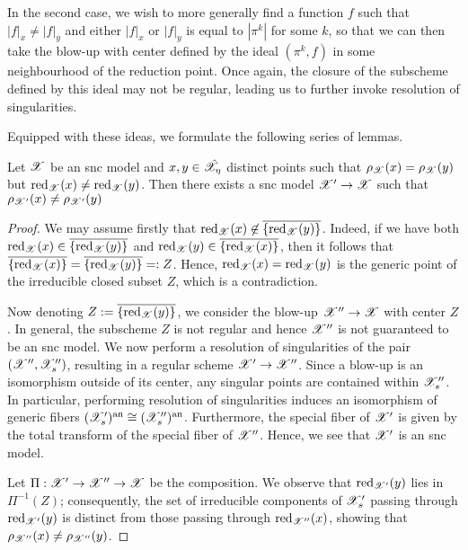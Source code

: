 In the second case, we wish to more generally find a function $f$ such that $|f|_x \neq |f|_y$ and either $|f|_x$ or $|f|_y$ is equal to $|\pi^{k}|$ for some $k$, so that we can then take the blow-up with center defined by the ideal $(\pi^{k}, f)$ in some neighbourhood of the reduction point.
Once again, the closure of the subscheme defined by this ideal may not be regular, leading us to further invoke resolution of singularities.

Equipped with these ideas, we formulate the following series of lemmas.


\begin{lemma}\label{rednotequal}
    Let $\mathscr{X}$ be an snc model and $x, y \in \hat{\mathscr{X}}_{\eta}$ distinct points such that $\rho_{\mathscr{X}}(x) = \rho_{\mathscr{X}}(y)$ but $\operatorname{red}_{\mathscr{X}}(x) \neq \operatorname{red}_{\mathscr{X}}(y)$.
    Then there exists a snc model $\mathscr{X}' \to \mathscr{X}$ such that $\rho_{\mathscr{X}'}(x) \neq \rho_{\mathscr{X}'}(y)$
\end{lemma}
\begin{proof}
    We may assume firstly that $\operatorname{red}_{\mathscr{X}}(x) \not\in \overline{\{\operatorname{red}_{\mathscr{X}}(y)\}}$. 
    Indeed, if we have both $\operatorname{red}_{\mathscr{X}}(x) \in \overline{\{\operatorname{red}_{\mathscr{X}}(y)\}}$ and $\operatorname{red}_{\mathscr{X}}(y) \in \overline{\{\operatorname{red}_{\mathscr{X}}(x)\}}$, then it follows that $\overline{\{\operatorname{red}_{\mathscr{X}}(x)\}} = \overline{\{\operatorname{red}_{\mathscr{X}}(y)\}} =: Z$.
    Hence, $\operatorname{red}_{\mathscr{X}}(x) = \operatorname{red}_{\mathscr{X}}(y)$ is the generic point of the irreducible closed subset $Z$, which is a contradiction.
    
    Now denoting $Z := \overline{\{\operatorname{red}_{\mathscr{X}}(y)\}}$, we consider the blow-up $\mathscr{X}'' \to \mathscr{X}$ with center $Z$.
    In general, the subscheme $Z$ is not regular and hence $\mathscr{X}''$ is not guaranteed to be an snc model.
    We now perform a resolution of singularities of the pair $(\mathscr{X}'', \mathscr{X}_s'')$, resulting in a regular scheme $\mathscr{X}' \to \mathscr{X}''$.
    Since a blow-up is an isomorphism outside of its center, any singular points are contained within $\mathscr{X}_s''$.
    In particular, performing resolution of singularities induces an isomorphism of generic fibers $(\mathscr{X}_s')^{\text{an}} \cong (\mathscr{X}_s'')^{\text{an}}$.
    Furthermore, the special fiber of $\mathscr{X}'$ is given by the total transform of the special fiber of $\mathscr{X}''$.
    Hence, we see that $\mathscr{X}'$ is an snc model.
    
    Let $\Pi: \mathscr{X}' \to \mathscr{X}'' \to \mathscr{X}$ be the composition.
    We observe that $\operatorname{red}_{\mathscr{X}'}(y)$ lies in $\Pi^{-1}(Z)$; consequently, the set of irreducible components of $\mathscr{X}'_{s}$ passing through $\operatorname{red}_{\mathscr{X}'}(y)$ is distinct from those passing through $\operatorname{red}_{\mathscr{X}''}(x)$, showing that ${\rho_{\mathscr{X}''}(x)} \neq {\rho_{\mathscr{X}''}(y)}$.
\end{proof}

